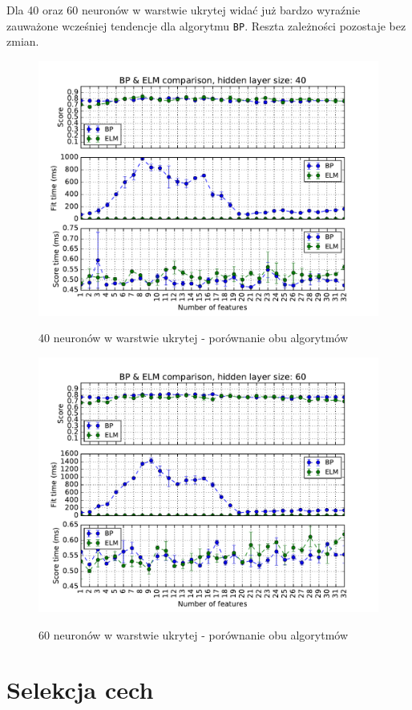 \newpage

Dla 40 oraz 60 neuronów w warstwie ukrytej widać już bardzo wyraźnie zauważone wcześniej tendencje dla algorytmu \texttt{BP}. Reszta zależności pozostaje bez zmian.

\begin{figure}[h!]
	\centering
	\includegraphics[width=0.78\linewidth]{img/bp_elm_40.pdf}
	\label{Rysunek}
	\caption{40 neuronów w warstwie ukrytej - porównanie obu algorytmów}
\end{figure}

\begin{figure}[h!]
	\centering
	\includegraphics[width=0.78\linewidth]{img/bp_elm_60.pdf}
	\label{Rysunek}
	\caption{60 neuronów w warstwie ukrytej - porównanie obu algorytmów}
\end{figure}

\newpage

\section{Selekcja cech}

